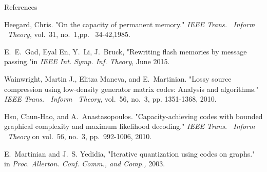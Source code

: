 \documentclass{beamer}
\newlength{\threecolwid}
\begin{document}
\begin{frame}
\begin{columns}[t]
\begin{column}{\threecolwid}
    \vspace{2.5cm}
    \begin{block}{References}

      \begin{thebibliography}{10}
Heegard, Chris. "On the capacity of permanent memory." \emph{ IEEE Trans. \ Inform \ Theory}, vol.~31, no.~1,pp. ~34-42,1985.

E.~E.~Gad, Eyal En, Y.~Li, J.~Bruck, "Rewriting flash memories by message passing."in
\emph{IEEE Int. Symp. Inf. Theory}, June 2015.

		Wainwright, Martin J., Elitza Maneva, and E.~Martinian. "Lossy source compression using low-density generator matrix 		codes: Analysis and algorithms." \emph{IEEE Trans. \ Inform \ Theory}, vol.~56, no.~3, pp. 1351-1368, 2010. 
		\vspace{1cm}

Hsu, Chun-Hao, and A.~Anastasopoulos. "Capacity-achieving codes with bounded graphical complexity and maximum likelihood decoding." \emph{IEEE Trans. \ Inform \ Theory} on vol.~56, no.~3, pp.~992-1006, 2010.

        E.~Martinian and J.~S. Yedidia, "Iterative quantization using codes on graphs." in 
        \emph{ Proc. Allerton. Conf. Comm., and Comp., } 2003.
        \vspace{1cm}

 		\end{thebibliography}
	  \end{block}
 
  \end{column}
\end{columns}
\end{frame}
\end{document}
